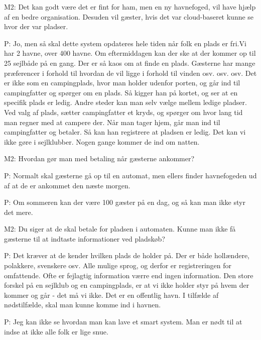 M2: Det kan godt være det er fint for ham, men en ny havnefoged, vil have hjælp af en bedre organisation. Desuden vil gæster, hvis det var cloud-baseret kunne se hvor der var pladser.

P: Jo, men så skal dette system opdateres hele tiden når folk en plads er fri.Vi har 2 havne, over 400 havne. Om eftermiddagen kan der ske at der kommer op til 25 sejlbåde på en gang. Der er så kaos om at finde en plads. Gæsterne har mange præferencer i forhold til hvordan de vil ligge i forhold til vinden osv. osv. osv. Det er ikke som en campingplads, hvor man holder udenfor porten, og går ind til campingfatter og spørger om en plads. Så kigger han på kortet, og ser at en specifik plads er ledig. Andre steder kan man selv vælge mellem ledige pladser. Ved valg af plads, sætter campingfatter et kryds, og spørger om hvor lang tid man regner med at campere der. Når man tager hjem, går man ind til campingfatter og betaler. Så kan han registrere at pladsen er ledig. Det kan vi ikke gøre i sejlklubber. Nogen gange kommer de ind om natten.

M2: Hvordan gør man med betaling når gæsterne ankommer?

P: Normalt skal gæsterne gå op til en automat, men ellers finder havnefogeden ud af at de er ankommet den næste morgen.

P: Om sommeren kan der være 100 gæster på en dag, og så kan man ikke styr det mere.

M2: Du siger at de skal betale for pladsen i automaten. Kunne man ikke få gæsterne til at indtaste informationer ved pladskøb? 

P: Det kræver at de kender hvilken plads de holder på. Der er både hollændere, polakkere, svenskere osv. Alle mulige sprog, og derfor er registreringen for omfattende. Ofte er fejlagtig information værre end ingen information. Den store forskel på en sejlklub og en campingplads, er at vi ikke holder styr på hvem der kommer og går - det må vi ikke. Det er en offentlig havn. I tilfælde af nødstilfælde, skal man kunne komme ind i havnen.

P: Jeg kan ikke se hvordan man kan lave et smart system. Man er nødt til at indse at ikke alle folk er lige snue. 